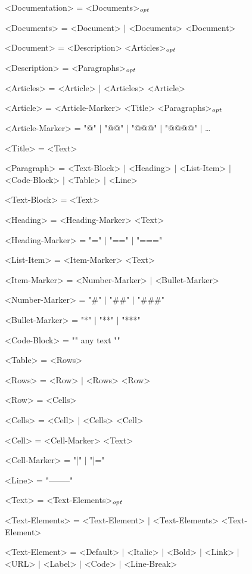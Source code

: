 \begin{figure}
\centering\ifbook\small\fi\setlength{\grammarparsep}{0ex}
\begin{minipage}{34em}\begin{grammar}
<Documentation> = <Documents>$_\mathit{opt}$ \par
<Documents> = <Document> $\mid$ <Documents> <Document> \par
<Document> = <Description> <Articles>$_\mathit{opt}$ \par
<Description> = <Paragraphs>$_\mathit{opt}$ \par
<Articles> = <Article> $\mid$ <Articles> <Article> \par
<Article> = <Article-Marker> <Title> <Paragraphs>$_\mathit{opt}$ \par
<Article-Marker> = "@" $\mid$ "@@" $\mid$ "@@@" $\mid$ "@@@@" $\mid$ \ldots \par
<Title> = <Text> \par
<Paragraph> = <Text-Block> $\mid$ <Heading> $\mid$ <List-Item> $\mid$ <Code-Block> $\mid$ <Table> $\mid$ <Line> \par
<Text-Block> = <Text> \par
<Heading> = <Heading-Marker> <Text> \par
<Heading-Marker> = "=" $\mid$ "==" $\mid$ "===" \par
<List-Item> = <Item-Marker> <Text> \par
<Item-Marker> = <Number-Marker> $\mid$ <Bullet-Marker> \par
<Number-Marker> = "#" $\mid$ "##" $\mid$ "###" \par
<Bullet-Marker> = "*" $\mid$ "**" $\mid$ "***" \par
<Code-Block> = "{{{" any text "}}}" \par
<Table> = <Rows> \par
<Rows> = <Row> $\mid$ <Rows> <Row> \par
<Row> = <Cells> \par
<Cells> = <Cell> $\mid$ <Cells> <Cell> \par
<Cell> = <Cell-Marker> <Text> \par
<Cell-Marker> = "|" $\mid$ "|=" \par
<Line> = "--------" \par
<Text> = <Text-Elements>$_\mathit{opt}$ \par
<Text-Elements> = <Text-Element> $\mid$ <Text-Elements> <Text-Element> \par
<Text-Element> = <Default> $\mid$ <Italic> $\mid$ <Bold> $\mid$ <Link> $\mid$ <URL> $\mid$ <Label> $\mid$ <Code> $\mid$ <Line-Break> \par

\end{grammar}
\end{minipage}
\end{figure}
